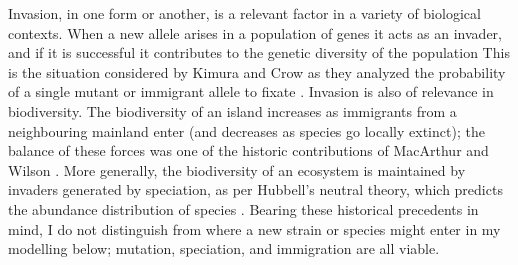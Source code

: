 Invasion, in one form or another, is a relevant factor in a variety of biological contexts. 
When a new allele arises in a population of genes it acts as an invader, and if it is successful it contributes to the genetic diversity of the population
This is the situation considered by Kimura and Crow as they analyzed the probability of a single mutant or immigrant allele to fixate \cite{Crow1956,Kimura1964,Kimura1968}. 
Invasion is also of relevance in biodiversity. 
The biodiversity of an island increases as immigrants from a neighbouring mainland enter (and decreases as species go locally extinct); the balance of these forces was one of the historic contributions of MacArthur and Wilson \cite{MacArthur1963,MacArthur1967a}. 
More generally, the biodiversity of an ecosystem is maintained by invaders generated by speciation, as per Hubbell's neutral theory, which predicts the abundance distribution of species \cite{Hubbell2001}. 
%
Bearing these historical precedents in mind, I do not distinguish from where a new strain or species might enter in my modelling below; mutation, speciation, and immigration are all viable. 

